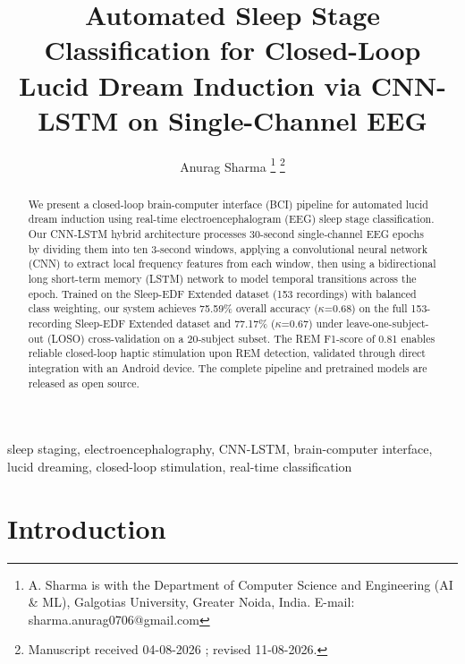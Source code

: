 \documentclass[journal]{IEEEtran}
\begin{document}
\title{Automated Sleep Stage Classification for 
Closed-Loop Lucid Dream Induction via CNN-LSTM 
on Single-Channel EEG}

\author{Anurag Sharma
\thanks{A. Sharma is with the Department of Computer
Science and Engineering (AI \& ML), Galgotias University,
Greater Noida, India.
E-mail: sharma.anurag0706@gmail.com}
\thanks{Manuscript received 04-08-2026 ; revised 11-08-2026.}}


\maketitle

\begin{abstract}
We present a closed-loop brain-computer interface (BCI)
pipeline for automated lucid dream induction using
real-time electroencephalogram (EEG) sleep stage
classification.
Our CNN-LSTM hybrid architecture processes 30-second
single-channel EEG epochs by dividing them into ten
3-second windows, applying a convolutional neural
network (CNN) to extract local frequency features
from each window, then using a bidirectional long
short-term memory (LSTM) network to model temporal
transitions across the epoch.
Trained on the Sleep-EDF Extended dataset
(153 recordings) with balanced class weighting,
our system achieves 75.59\% overall accuracy ($\kappa$=0.68) 
on the full 153-recording Sleep-EDF Extended dataset 
and 77.17\% ($\kappa$=0.67) under leave-one-subject-out 
(LOSO) cross-validation on a 20-subject subset.
The REM F1-score of 0.81 enables reliable closed-loop
haptic stimulation upon REM detection, validated
through direct integration with an Android device.
The complete pipeline and pretrained models are
released as open source.
\end{abstract}

\begin{IEEEkeywords}
sleep staging, electroencephalography, CNN-LSTM,
brain-computer interface, lucid dreaming,
closed-loop stimulation, real-time classification
\end{IEEEkeywords}

\section{Introduction}
\label{sec:intro}
\end{document}
